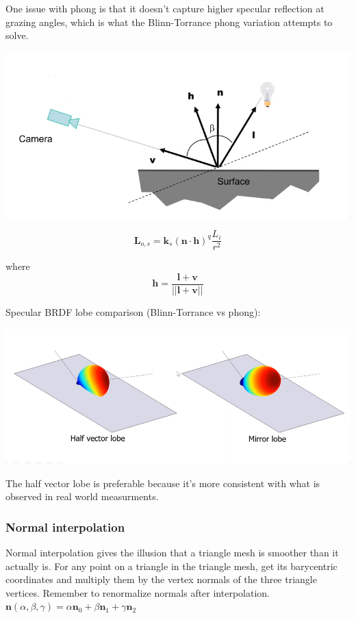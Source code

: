 \documentclass[12pt]{article}
\begin{document}
One issue with phong is that it doesn't capture higher specular
reflection at grazing angles, which is what the Blinn-Torrance phong
variation attempts to solve.

\includegraphics[scale=.5]{images/blinn-torrance.png}

\[ \bm L_{o,s} = \bm k_s (\bm n \cdot \bm h)^q \frac{L_i}{r^2} \]

where
\[ \bm h = \frac{\bm l + \bm v}{||\bm l + \bm v||} \]

Specular BRDF lobe comparison (Blinn-Torrance vs phong):

\includegraphics[scale=.5]{images/phong-blinn-lobe-comparison.png}

The half vector lobe is preferable because it's more consistent with
what is observed in real world measurments.

\subsubsection{Normal interpolation}

Normal interpolation gives the illusion that a triangle mesh
is smoother than it actually is. For any point on a triangle
in the triangle mesh, get its barycentric coordinates and multiply
them by the vertex normals of the three triangle vertices. Remember
to renormalize normals after interpolation.
$\bm n(\alpha,\beta,\gamma) = \alpha \bm n_0 + \beta \bm n_1 + \gamma \bm n_2$
\end{document}
